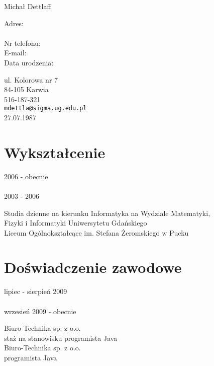 \documentclass[letterpaper]{article}
\def\name{Michał Dettlaff}
\begin{document}
{\huge \name}


\vspace{0.25in}

\begin{minipage}{0.30\linewidth}
  Adres:\\
  \\
  Nr telefonu:\\
  E-mail:\\
  Data urodzenia:
\end{minipage}
\begin{minipage}{0.70\linewidth}
    ul. Kolorowa nr 7\\
    84-105 Karwia\\
    516-187-321\\
    \href{mailto:mdettla@sigma.ug.edu.pl}{\tt mdettla@sigma.ug.edu.pl}\\
    27.07.1987
\end{minipage}


\section*{Wykształcenie}

\begin{minipage}{0.30\linewidth}
  2006 - obecnie\\
  \\
  2003 - 2006
\end{minipage}
\begin{minipage}{0.70\linewidth}
  Studia dzienne na kierunku Informatyka na Wydziale Matematyki,\\
  Fizyki i Informatyki Uniwersytetu Gdańskiego\\
  Liceum Ogólnokształcące im. Stefana Żeromskiego w Pucku
\end{minipage}


\section*{Doświadczenie zawodowe}

\begin{minipage}{0.30\linewidth}
  lipiec - sierpień 2009\\
  \\
  wrzesień 2009 - obecnie\\
\end{minipage}
\begin{minipage}{0.70\linewidth}
  Biuro-Technika sp. z o.o.\\
  staż na stanowisku programista Java\\
  Biuro-Technika sp. z o.o.\\
  programista Java
\end{minipage}
\end{document}
